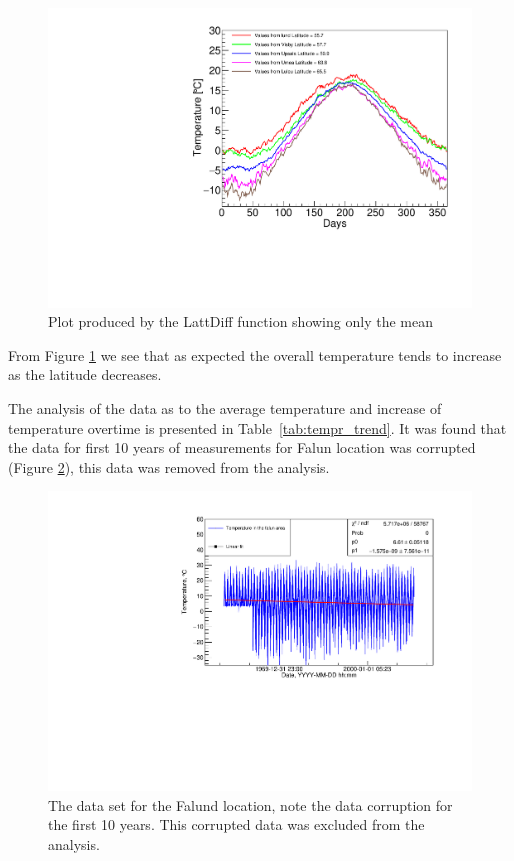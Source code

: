 \documentclass[a4paper,12pt]{article}
\begin{document}
\begin{figure}[h!]
    \centering
    \includegraphics[scale = 0.7]{every_day_graph_multiple_locations_just_means.pdf}
    \caption{Plot produced by the LattDiff function showing only the mean}
    \label{fig:LattDiff_no}
\end{figure}

From Figure \ref{fig:LattDiff_no} we see that as expected the overall temperature tends to increase as the latitude decreases.


The analysis of the data as to the average temperature and increase of temperature 
overtime is presented in Table~\ref{tab:tempr_trend}. It was found that the data for first 10 years of
measurements for Falun location was corrupted (Figure \ref{fig:falund}), this data was
removed from the analysis.

\begin{figure}
    \centering
    \includegraphics[width=0.8\linewidth]{temperature_falun_corrupted.pdf}
    \caption{The data set for the Falund location, note the data corruption for 
    the first 10 years. This corrupted data was excluded from the analysis.}
    \label{fig:falund}
\end{figure}
\end{document}
